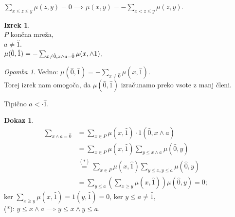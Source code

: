 \documentclass[a4paper, 12pt]{book}
\theoremstyle{definition}
\newtheorem{theorem}[counter]{Izrek}
\newtheorem{pro}[counter]{Dokaz}
\theoremstyle{remark}
\newtheorem*{rem}{Opomba}
\begin{document}
$\sum_{x \leq z \leq y} \mu(z, y) = 0 \implies \mu(x, y) = - \sum_{x < z \leq y} \mu(z, y)$.
\begin{theorem} \text{} \\
  $P$ končna mreža, \\
  $a \neq \hat{1}$. \\
  $\mu(\hat{0}, \hat{1}) = - \sum_{x \neq \hat{0}, \\x \land a = \hat{0}} \mu(x, \land{1})$.
\end{theorem}
\begin{rem}
  Vedno: $\mu(\hat{0}, \hat{1}) = - \sum_{x \neq \hat{0}} \mu(x, \hat{1})$. \\
  Torej izrek nam omogoča, da $\mu(\hat{0}, \hat{1})$ izračunamo preko vsote z manj členi.
\end{rem}
Tipično $a <\cdot \hat{1}$.
\begin{pro}
  \begin{align*}
    \sum_{x \land a = \hat{0}}
    &= \sum_{x \in P} \mu(x, \hat{1}) \cdot 1(\hat{0}, x \land a) \\
    &= \sum_{x \in P} \mu(x, \hat{1}) \sum_{y \leq x \land a} \mu(\hat{0}, y) \\
    &\stackrel{(*)}{=} \sum_{x \in P} \mu(x, \hat{1})
      \sum_{y \leq x, y \leq a} \mu(\hat{0}, y) \\
    &= \sum_{y \leq a} \left(\sum_{x \geq y} \mu(x, \hat{1})\right) \mu(\hat{0}, y) = 0;
  \end{align*}
  ker $\sum_{x \geq y} \mu(x, \hat{1}) = 1(y, \hat{1}) = 0$, ker $y \leq a \neq \hat{1}$, \\
  (*): $y \leq x \land a \implies y \leq x \land y \leq a$.
\end{pro}
\end{document}
